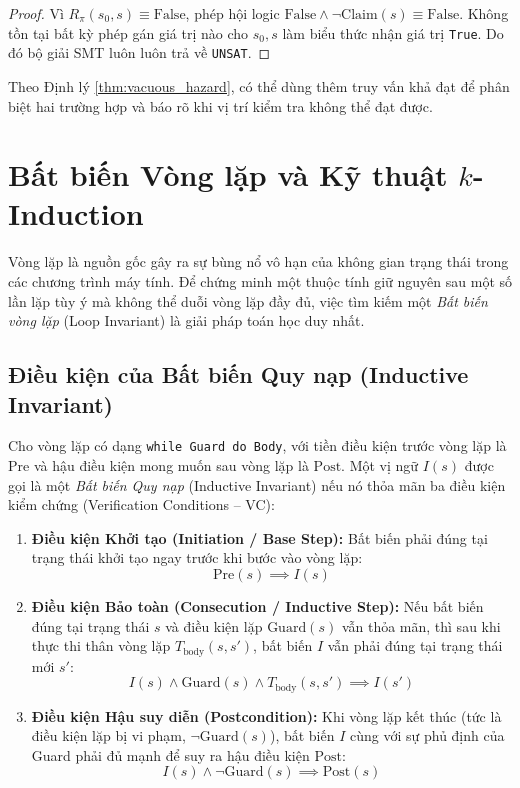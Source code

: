 \begin{proof}
Vì $R_{\pi}(s_0, s) \equiv \text{False}$, phép hội logic $\text{False} \land \neg \text{Claim}(s) \equiv \text{False}$. Không tồn tại bất kỳ phép gán giá trị nào cho $s_0, s$ làm biểu thức nhận giá trị \texttt{True}. Do đó bộ giải SMT luôn luôn trả về \texttt{UNSAT}.
\end{proof}

Theo Định lý \ref{thm:vacuous_hazard}, có thể dùng thêm truy vấn khả đạt để phân biệt hai trường hợp và báo rõ khi vị trí kiểm tra không thể đạt được.

\section{Bất biến Vòng lặp và Kỹ thuật $k$-Induction}
\label{sec:loop_invariants_k_induction}

Vòng lặp là nguồn gốc gây ra sự bùng nổ vô hạn của không gian trạng thái trong các chương trình máy tính. Để chứng minh một thuộc tính giữ nguyên sau một số lần lặp tùy ý mà không thể duỗi vòng lặp đầy đủ, việc tìm kiếm một \textit{Bất biến vòng lặp} (Loop Invariant) là giải pháp toán học duy nhất.

\subsection{Điều kiện của Bất biến Quy nạp (Inductive Invariant)}
Cho vòng lặp có dạng \texttt{while Guard do Body}, với tiền điều kiện trước vòng lặp là $\text{Pre}$ và hậu điều kiện mong muốn sau vòng lặp là $\text{Post}$. Một vị ngữ $I(s)$ được gọi là một \textit{Bất biến Quy nạp} (Inductive Invariant) nếu nó thỏa mãn ba điều kiện kiểm chứng (Verification Conditions -- VC):

\begin{enumerate}
    \item \textbf{Điều kiện Khởi tạo (Initiation / Base Step):} Bất biến phải đúng tại trạng thái khởi tạo ngay trước khi bước vào vòng lặp:
    \begin{equation}
    \text{Pre}(s) \implies I(s)
    \end{equation}

    \item \textbf{Điều kiện Bảo toàn (Consecution / Inductive Step):} Nếu bất biến đúng tại trạng thái $s$ và điều kiện lặp $\text{Guard}(s)$ vẫn thỏa mãn, thì sau khi thực thi thân vòng lặp $T_{\text{body}}(s, s')$, bất biến $I$ vẫn phải đúng tại trạng thái mới $s'$:
    \begin{equation}
    I(s) \land \text{Guard}(s) \land T_{\text{body}}(s, s') \implies I(s')
    \end{equation}

    \item \textbf{Điều kiện Hậu suy diễn (Postcondition):} Khi vòng lặp kết thúc (tức là điều kiện lặp bị vi phạm, $\neg \text{Guard}(s)$), bất biến $I$ cùng với sự phủ định của Guard phải đủ mạnh để suy ra hậu điều kiện $\text{Post}$:
    \begin{equation}
    I(s) \land \neg \text{Guard}(s) \implies \text{Post}(s)
    \end{equation}
\end{enumerate}

